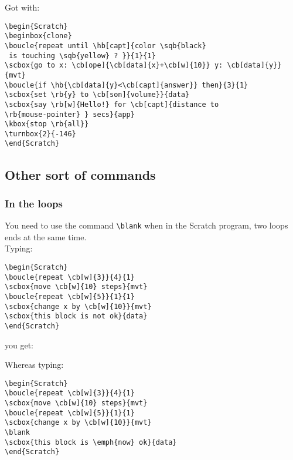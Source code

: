 \documentclass[a4paper,11pt]{article}
\begin{document}
Got with:

\begin{verbatim}
\begin{Scratch}
\beginbox{clone}
\boucle{repeat until \hb[capt]{color \sqb{black}
 is touching \sqb{yellow} ? }}{1}{1}
\scbox{go to x: \cb[ope]{\cb[data]{x}+\cb[w]{10}} y: \cb[data]{y}}{mvt}
\boucle{if \hb{\cb[data]{y}<\cb[capt]{answer}} then}{3}{1}
\scbox{set \rb{y} to \cb[son]{volume}}{data}
\scbox{say \rb[w]{Hello!} for \cb[capt]{distance to
\rb{mouse-pointer} } secs}{app}
\kbox{stop \rb{all}}
\turnbox{2}{-146}
\end{Scratch}
\end{verbatim}

\subsection{Other sort of commands}

\subsubsection{In the loops}%

You need to use the command \texttt{\textbackslash blank} when in the Scratch program, two loops ends at the same time.\\

Typing:
\begin{verbatim}
\begin{Scratch}
\boucle{repeat \cb[w]{3}}{4}{1}
\scbox{move \cb[w]{10} steps}{mvt}
\boucle{repeat \cb[w]{5}}{1}{1}
\scbox{change x by \cb[w]{10}}{mvt}
\scbox{this block is not ok}{data}
\end{Scratch}
\end{verbatim}

you get:\\

\begin{Scratch}
\end{Scratch}

\vspace{0.5cm}

Whereas typing:
\begin{verbatim}
\begin{Scratch}
\boucle{repeat \cb[w]{3}}{4}{1}
\scbox{move \cb[w]{10} steps}{mvt}
\boucle{repeat \cb[w]{5}}{1}{1}
\scbox{change x by \cb[w]{10}}{mvt}
\blank
\scbox{this block is \emph{now} ok}{data}
\end{Scratch}
\end{verbatim}
\end{document}
